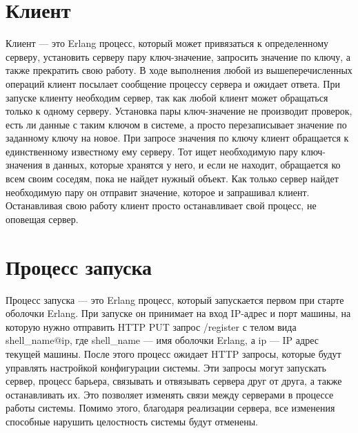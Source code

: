 	\section{Клиент}
		Клиент --- это Erlang процесс, который может привязаться к определенному серверу, установить серверу пару ключ-значение,
		запросить значение по ключу, а также прекратить свою работу. В ходе выполнения любой из вышеперечисленных операций клиент посылает сообщение
		процессу сервера и ожидает ответа. При запуске клиенту необходим сервер, так как любой клиент может обращаться только к одному серверу.
		Установка пары ключ-значение не производит проверок, есть ли данные с таким ключом в системе, а просто перезаписывает значение по заданному 
		ключу на новое. При запросе значения по ключу клиент обращается к единственному известному ему серверу. Тот ищет необходимую пару ключ-значения 
		в данных, которые хранятся у него, и если не находит, обращается ко всем своим соседям, пока не найдет нужный объект. Как только сервер найдет
		необходимую пару он отправит значение, которое и запрашивал клиент. Останавливая свою работу клиент просто останавливает свой процесс, не оповещая
		сервер.


	\section{Процесс запуска}
		Процесс запуска --- это Erlang процесс, который запускается первом при старте оболочки Erlang. При запуске он принимает на вход IP-адрес и порт 
		машины, на которую нужно отправить HTTP PUT запрос /register с телом вида shell\_name@ip, где shell\_name --- имя оболочки Erlang, а ip --- IP адрес
		текущей машины. После этого процесс ожидает HTTP запросы, которые будут управлять настройкой конфигурации системы. Эти запросы могут запускать
		сервер, процесс барьера, связывать и отвязывать сервера друг от друга, а также останавливать их. Это позволяет изменять связи между серверами 
		в процессе работы системы. Помимо этого, благодаря реализации сервера, все изменения способные нарушить целостность системы будут отменены.
	

